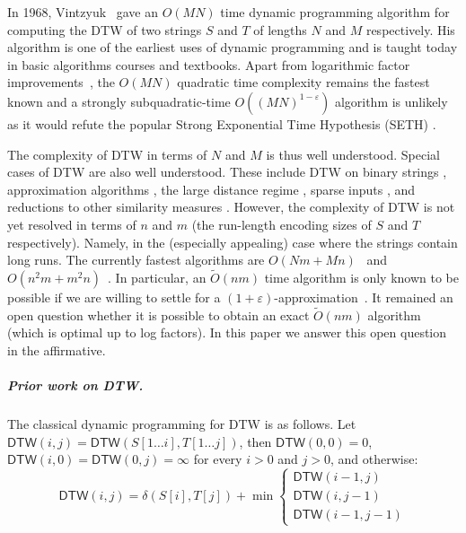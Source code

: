 \documentclass[a4paper,UKenglish,cleveref, autoref, thm-restate]{lipics-v2021}
\newcommand{\DTW}{\mathsf{DTW}}
\newcommand{\para}[1]{\vspace{-0.1in} \subparagraph*{#1}}
\begin{document}
In 1968, Vintzyuk~\cite{vintzyuk1968} gave an $O(MN)$ time dynamic programming algorithm for computing the DTW of two strings $S$ and $T$ of lengths $N$ and $M$ respectively. His algorithm is one of the earliest uses of dynamic programming and is  taught today in basic algorithms courses and textbooks. Apart from logarithmic factor improvements~\cite{DBLP:conf/icalp/GoldS17}, the $O(MN)$ quadratic time complexity remains the fastest known and a strongly subquadratic-time  $O((MN)^{1-\varepsilon})$ algorithm is unlikely as it would refute the popular Strong Exponential
Time Hypothesis (SETH) \cite{DTWhard2,DTWhard}. 

The complexity of DTW in terms of $N$ and $M$ is thus well understood. Special cases of DTW are also well understood. These include DTW on binary strings \cite{kuszmaul2021binary, schaar2020faster}, approximation algorithms \cite{DBLP:conf/icalp/Kuszmaul19, DTWapprox1, DTWapprox2}, the large distance regime \cite{DBLP:conf/icalp/Kuszmaul19}, sparse inputs \cite{sparseDTW1,sparseDTW2,sparseDTW3},  
and reductions to other similarity measures
\cite{DBLP:conf/icalp/Kuszmaul19,sakai2020reduction, sakai2020faster}.
However, the complexity of DTW is not yet resolved in terms of $n$ and $m$ (the run-length encoding sizes of $S$ and $T$ respectively). Namely, in the (especially appealing) case where the strings contain long runs. 
The currently fastest algorithms are $O(Nm+Mn)$~\cite{rle1,DBLP:journals/corr/abs-1903-03003,DBLP:conf/icalp/Kuszmaul19} and $O(n^2m +m^2n)$~\cite{DBLP:journals/corr/abs-1903-03003}. In particular, an  $\tilde O(nm)$ time algorithm is only known to be possible if we are willing to settle for a $(1+\varepsilon)$-approximation~\cite{DBLP:conf/esa/XiK22}. It remained an open question whether it is possible to obtain an exact $\tilde O(nm)$ algorithm (which is optimal up to log factors). In this paper we answer this open question in the affirmative.

\para{Prior work on DTW.}   

The classical dynamic programming for DTW is as follows. Let 
 $\DTW(i,j) = \DTW(S[1\ldots i], T[1\ldots j])$, then $\DTW(0,0) = 0$, $\DTW(i,0)=\DTW(0,j) = \infty$ for every $i>0$ and $j>0$, and otherwise:
\begin{equation}\label{eq:dtw}
\DTW(i,j)=   \delta(S[i],T[j]) + \min\begin{cases} 
\DTW(i-1,j)
\\
\DTW(i,j-1) 
\\
\DTW(i-1,j-1)
\end{cases}
\end{equation}
\end{document}
